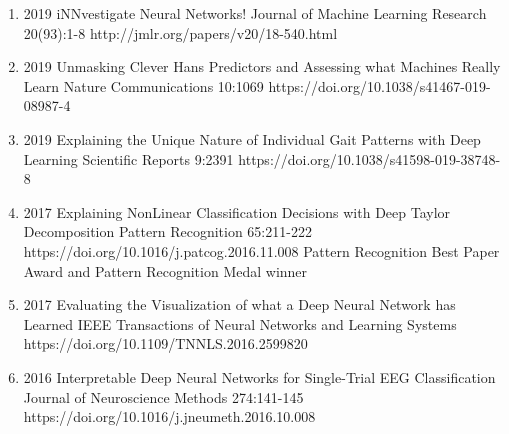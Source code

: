 \documentclass[10pt,a4paper]{article} %
\begin{document}
{\begin{enumerate}
    \item[] 
                        {2019}
                        {iNNvestigate Neural Networks!}
                        {Journal of Machine Learning Research}
                        {20(93):1-8}
                        {http://jmlr.org/papers/v20/18-540.html}

    \item[] 
                        {2019}
                        {Unmasking Clever Hans Predictors and Assessing what Machines Really Learn}
                        {Nature Communications}
                        {10:1069}
                        {https://doi.org/10.1038/s41467-019-08987-4}

    \item[] 
                        {2019}
                        {Explaining the Unique Nature of Individual Gait Patterns with Deep Learning}
                        {Scientific Reports}
                        {9:2391}
                        {https://doi.org/10.1038/s41598-019-38748-8}

    \item[] 
                            {2017}
                            {Explaining NonLinear Classification Decisions with Deep Taylor Decomposition}
                            {Pattern Recognition}
                            {65:211-222}
                            {https://doi.org/10.1016/j.patcog.2016.11.008}
                            {Pattern Recognition Best Paper Award and Pattern Recognition Medal winner}

    \item[] 
                        {2017}
                        {Evaluating the Visualization of what a Deep Neural Network has Learned}
                        {IEEE Transactions of Neural Networks and Learning Systems}
                        {}
                        {https://doi.org/10.1109/TNNLS.2016.2599820}

    \item[] 
                        {2016}
                        {Interpretable Deep Neural Networks for Single-Trial EEG Classification}
                        {Journal of Neuroscience Methods}
                        {274:141-145}
                        {https://doi.org/10.1016/j.jneumeth.2016.10.008}


\end{enumerate}}
\end{document}
